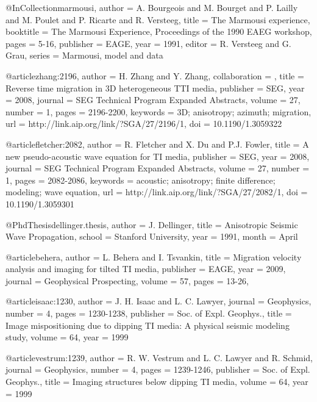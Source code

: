 @InCollection{marmousi,
  author =	 {A. Bourgeois and M. Bourget and P. Lailly and
                  M. Poulet and P. Ricarte and R. Versteeg},
  title =	 {The {M}armousi experience},
  booktitle =	 {The Marmousi Experience, Proceedings of the 1990
                  EAEG workshop},
  pages =	 {5-16},
  publisher =    {EAGE},
  year =	 1991,
  editor =	 {R. Versteeg and G. Grau},
  series =	 {Marmousi, model and data}
}

@article{zhang:2196,
author = {H. Zhang and Y. Zhang},
collaboration = {},
title = {Reverse time migration in 3{D} heterogeneous {TTI} media},
publisher = {SEG},
year = {2008},
journal = {SEG Technical Program Expanded Abstracts},
volume = {27},
number = {1},
pages = {2196-2200},
keywords = {3D; anisotropy; azimuth; migration},
url = {http://link.aip.org/link/?SGA/27/2196/1},
doi = {10.1190/1.3059322}
}

@article{fletcher:2082,
  author =	 {R. Fletcher and X. Du and P.J. Fowler},
  title =	 {A new pseudo-acoustic wave equation for {TI} media},
  publisher =	 {SEG},
  year =	 2008,
  journal =	 {SEG Technical Program Expanded Abstracts},
  volume =	 27,
  number =	 1,
  pages =	 {2082-2086},
  keywords =	 {acoustic; anisotropy; finite difference; modeling;
                  wave equation},
  url =		 {http://link.aip.org/link/?SGA/27/2082/1},
  doi =		 {10.1190/1.3059301}
}

@PhdThesis{dellinger.thesis,
  author =	 {J. Dellinger},
  title =	 {Anisotropic Seismic Wave Propagation},
  school =	 {Stanford University},
  year =	 1991,
  month =	 {April}
}

@article{behera,
  author =	 {L. Behera and I. Tsvankin},
  title =	 {Migration velocity analysis and imaging for tilted
                  {TI} media},
  publisher =	 {EAGE},
  year =	 2009,
  journal =	 {Geophysical Prospecting},
  volume =	 57,
  pages =	 {13-26},
}

@article{isaac:1230,
  author =	 {J. H. Isaac and L. C. Lawyer},
  journal =	 {Geophysics},
  number =	 4,
  pages =	 {1230-1238},
  publisher =	 {Soc. of Expl. Geophys.},
  title =	 {Image mispositioning due to dipping {TI} media: {A}
                  physical seismic modeling study},
  volume =	 64,
  year =	 1999
}

@article{vestrum:1239,
  author =	 {R. W. Vestrum and L. C. Lawyer and R. Schmid},
  journal =	 {Geophysics},
  number =	 4,
  pages =	 {1239-1246},
  publisher =	 {Soc. of Expl. Geophys.},
  title =	 {Imaging structures below dipping {TI} media},
  volume =	 64,
  year =	 1999
}

